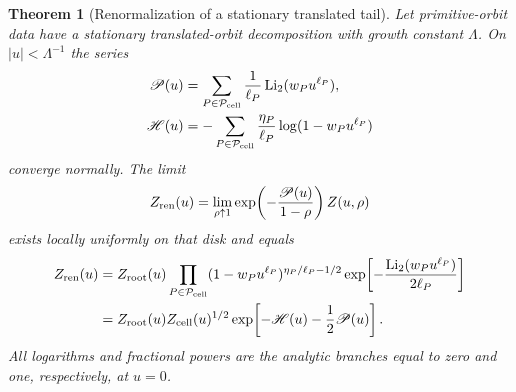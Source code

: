 \documentclass[11pt,reqno]{amsart}
\numberwithin{equation}{section}
\newtheorem{theorem}{Theorem}[section]
\theoremstyle{definition}
\theoremstyle{remark}
\newcommand{\Li}{\operatorname{Li}_2}
\begin{document}
\begin{theorem}[Renormalization of a stationary translated tail]
\label{thm:abstract-renormalized-limit}
Let primitive-orbit data have a stationary translated-orbit decomposition with
growth constant $\Lambda$.  On $|u|<\Lambda^{-1}$ the
series
\begin{align}
 \mathscr P(u)&=\sum_{P\in\mathcal P_{\rm cell}}
 \frac1{\ell_P}\Li(w_Pu^{\ell_P}),\label{eq:abstract-counterterm}\\
 \mathscr H(u)&=-\sum_{P\in\mathcal P_{\rm cell}}
 \frac{\eta_P}{\ell_P}\log(1-w_Pu^{\ell_P})
 \label{eq:abstract-height-moment}
\end{align}
converge normally.  The limit
\begin{equation}\label{eq:renormalizedlimit}
 Z_{\rm ren}(u)=\lim_{\rho\uparrow1}
 \exp\!\left(-\frac{\mathscr P(u)}{1-\rho}\right)Z(u,\rho)
\end{equation}
exists locally uniformly on that disk and equals
\begin{align}
 Z_{\rm ren}(u)
 &=Z_{\rm root}(u)
 \prod_{P\in\mathcal P_{\rm cell}}
 (1-w_Pu^{\ell_P})^{\eta_P/\ell_P-1/2}
 \exp\!\left[-\frac{\Li(w_Pu^{\ell_P})}{2\ell_P}\right]
 \label{eq:renormalizedproduct}\\
 &=Z_{\rm root}(u)Z_{\rm cell}(u)^{1/2}
 \exp\!\left[-\mathscr H(u)-\frac12\mathscr P(u)\right].
 \label{eq:renormalizedcompact}
\end{align}
All logarithms and fractional powers are the analytic branches equal to zero
and one, respectively, at $u=0$.
\end{theorem}
\end{document}
